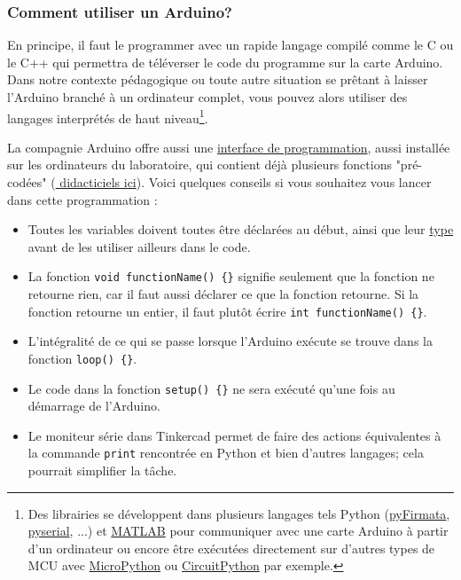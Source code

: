 \documentclass[canadien,12pt,oneside,letterpaper]{article}
\begin{document}
\subsubsection*{Comment utiliser un Arduino?}
 En principe, il faut le programmer avec un rapide langage compilé comme le C ou le C++ qui permettra de téléverser le code du programme sur la carte Arduino. Dans notre contexte pédagogique ou toute autre situation se prêtant à laisser l'Arduino branché à un ordinateur complet, vous pouvez alors utiliser des langages interprétés de haut niveau\footnote{Des librairies se développent dans plusieurs langages tels Python (\href{https://github.com/tino/pyFirmata}{pyFirmata}, \href{https://pypi.org/project/pyserial/}{pyserial}, ...) et \href{https://www.mathworks.com/help/supportpkg/arduinoio/examples/getting-started-with-matlab-support-package-for-arduino-hardware.html}{MATLAB} pour communiquer avec une carte Arduino à partir d'un ordinateur ou encore être exécutées directement sur d'autres types de MCU avec \href{https://micropython.org/}{MicroPython} ou \href{https://www.digikey.ca/en/maker/blogs/2018/python-on-hardware}{CircuitPython} par exemple.}. 
 

La compagnie Arduino offre aussi une \href{https://www.arduino.cc/en/software}{interface de programmation}, aussi installée sur les ordinateurs du laboratoire, qui contient déjà plusieurs fonctions "pré-codées" (\href{https://www.arduino.cc/en/Tutorial/BuiltInExamples}{
didacticiels ici}). Voici quelques conseils si vous souhaitez vous lancer dans cette programmation :
\begin{itemize}
    \item Toutes les variables doivent toutes être déclarées au début, ainsi que leur \href{https://en.wikipedia.org/wiki/C_data_types}{type} avant de les utiliser ailleurs dans le code.
    \item La fonction \texttt{void functionName()~\{\}} signifie seulement que la fonction ne retourne rien, car il faut aussi déclarer ce que la fonction retourne. Si la fonction retourne un entier, il faut plutôt écrire \texttt{int functionName()~\{\}}.
    \item L’intégralité de ce qui se passe lorsque l’Arduino exécute se trouve dans la fonction \texttt{loop()~\{\}}.
    \item Le code dans la fonction \texttt{setup()~\{\}} ne sera exécuté qu’une fois au démarrage de l’Arduino.
    \item Le moniteur série dans Tinkercad permet de faire des actions équivalentes à la commande \texttt{print} rencontrée en Python et bien d'autres langages; cela pourrait simplifier la tâche.
\end{itemize}
 
\end{document}
